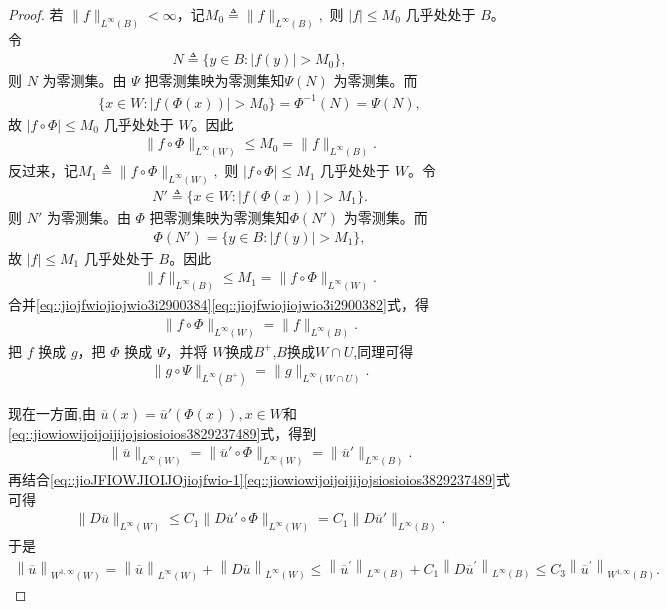 \documentclass[../../main.tex]{subfiles}
\begin{document}
\begin{proof}
若 \(\|f\|_{L^\infty(B)}<\infty\)，记$M_0\triangleq\|f\|_{L^\infty(B)},$
则 \(|f|\leqslant M_0\) 几乎处处于 \(B\)。令
\begin{align*}
N\triangleq\{y\in B:|f(y)|>M_0\},
\end{align*}
则 \(N\) 为零测集。由 \(\Psi\) 把零测集映为零测集知\(\Psi(N)\) 为零测集。而
\begin{align*}
\{x\in W:|f(\Phi(x))|>M_0\}=\Phi^{-1}(N)=\Psi(N),
\end{align*}
故 \(|f\circ\Phi|\leqslant M_0\) 几乎处处于 \(W\)。因此
\begin{align}\label{eq::jiojfwiojiojwio3i2900384}
\|f\circ\Phi\|_{L^\infty(W)}\leqslant M_0=\|f\|_{L^\infty(B)}.
\end{align}
反过来，记$M_1\triangleq\|f\circ\Phi\|_{L^\infty(W)},$
则 \(|f\circ\Phi|\leqslant M_1\) 几乎处处于 \(W\)。令
\begin{align*}
N'\triangleq\{x\in W:|f(\Phi(x))|>M_1\}.
\end{align*}
则 \(N'\) 为零测集。由 \(\Phi\) 把零测集映为零测集知\(\Phi(N')\) 为零测集。而
\begin{align*}
\Phi(N')=\{y\in B:|f(y)|>M_1\},
\end{align*}
故 \(|f|\leqslant M_1\) 几乎处处于 \(B\)。因此
\begin{align}\label{eq::jiojfwiojiojwio3i2900382}
\|f\|_{L^\infty(B)}\leqslant M_1=\|f\circ\Phi\|_{L^\infty(W)}.
\end{align}
合并\eqref{eq::jiojfwiojiojwio3i2900384}\eqref{eq::jiojfwiojiojwio3i2900382}式，得
\begin{align*}
\|f\circ\Phi\|_{L^\infty(W)}=\|f\|_{L^\infty(B)}.
\end{align*}
把 \(f\) 换成 \(g\)，把 \(\Phi\) 换成 \(\Psi\)，并将 \(W\)换成$B^+$,\(B\)换成$W\cap U$,同理可得
\begin{align*}
\|g\circ\Psi\|_{L^\infty(B^+)}=\|g\|_{L^\infty(W\cap U)}.
\end{align*}

现在一方面,由 \(\overline u(x)=\overline u'(\Phi(x)),x\in W\)和\eqref{eq::jiowiowijoijoijijojsiosioios3829237489}式，得到
\begin{align*}
\|\overline u\|_{L^\infty(W)}
=\|\overline u'\circ\Phi\|_{L^\infty(W)}
=\|\overline u'\|_{L^\infty(B)}.
\end{align*}
再结合\eqref{eq::jioJFIOWJIOIJOjiojfwio-1}\eqref{eq::jiowiowijoijoijijojsiosioios3829237489}式可得
\begin{align*}
\|D\overline u\|_{L^\infty(W)}
\leqslant C_1\|D\overline u'\circ\Phi\|_{L^\infty(W)}
=C_1\|D\overline u'\|_{L^\infty(B)}.
\end{align*}
于是
\begin{align}\label{eq::jiwjiofijoswjiowiow2390jw89023890}
\left\| \overline{u} \right\| _{W^{1,\infty}\left( W \right)}=\left\| \overline{u} \right\| _{L^{\infty}\left( W \right)}+\left\| D\overline{u} \right\| _{L^{\infty}\left( W \right)}\leqslant \left\| \overline{u}^{\prime} \right\| _{L^{\infty}\left( B \right)}+C_1\left\| D\overline{u}^{\prime} \right\| _{L^{\infty}\left( B \right)}\leqslant C_3\left\| \overline{u}^{\prime} \right\| _{W^{1,\infty}\left( B \right)}.
\end{align}


\end{proof}
\end{document}

